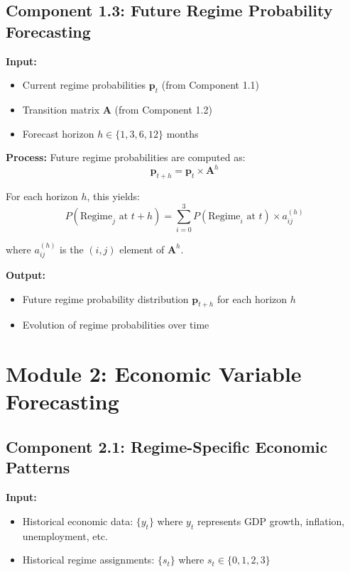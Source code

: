 \documentclass[11pt,a4paper]{article}
\begin{document}
\subsection{Component 1.3: Future Regime Probability Forecasting}

\textbf{Input:}
\begin{itemize}
    \item Current regime probabilities $\mathbf{p}_t$ (from Component 1.1)
    \item Transition matrix $\mathbf{A}$ (from Component 1.2)
    \item Forecast horizon $h \in \{1, 3, 6, 12\}$ months
\end{itemize}

\textbf{Process:}
Future regime probabilities are computed as:
\begin{equation}
    \mathbf{p}_{t+h} = \mathbf{p}_t \times \mathbf{A}^h
\end{equation}

For each horizon $h$, this yields:
\begin{equation}
    P(\text{Regime}_j \text{ at } t+h) = \sum_{i=0}^{3} P(\text{Regime}_i \text{ at } t) \times a_{ij}^{(h)}
\end{equation}

where $a_{ij}^{(h)}$ is the $(i,j)$ element of $\mathbf{A}^h$.

\textbf{Output:}
\begin{itemize}
    \item Future regime probability distribution $\mathbf{p}_{t+h}$ for each horizon $h$
    \item Evolution of regime probabilities over time
\end{itemize}

\section{Module 2: Economic Variable Forecasting}

\subsection{Component 2.1: Regime-Specific Economic Patterns}

\textbf{Input:}
\begin{itemize}
    \item Historical economic data: $\{y_t\}$ where $y_t$ represents GDP growth, inflation, unemployment, etc.
    \item Historical regime assignments: $\{s_t\}$ where $s_t \in \{0,1,2,3\}$
\end{itemize}
\end{document}
